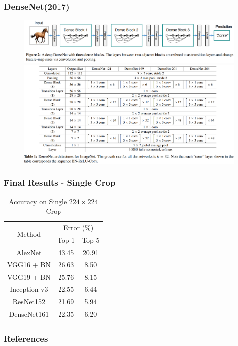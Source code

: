 \documentclass[9pt]{beamer}
\begin{document}
\begin{frame}
	\frametitle{DenseNet(2017)}
	\begin{figure}
		\includegraphics[scale=0.18]{./figures/edit/densenet_02.png} \\
		\includegraphics[scale=0.2]{./figures/edit/densenet_03.png} 		
	\end{figure}
\end{frame}

\begin{frame}
	\frametitle{Final Results - Single Crop}
		\begin{table}[]
		\centering
		\caption{Accuracy on Single $224\times 224$ Crop}
		\label{my-label}
		\begin{tabular}{|c|c|c|}
		\hline
		\multirow{2}{*}{Method} & \multicolumn{2}{c|}{Error (\%)} \\ \cline{2-3} 
		 & Top-1 & Top-5 \\ \hline
		AlexNet & 43.45 & 20.91 \\ \hline
		VGG16 + BN & 26.63 & 8.50 \\ \hline
		VGG19 + BN & 25.76 & 8.15 \\ \hline
		Inception-v3 & 22.55 & 6.44 \\ \hline
		ResNet152 & 21.69 & 5.94 \\ \hline
		DenseNet161 & 22.35 & 6.20 \\ \hline
		\end{tabular}
		\end{table}
\end{frame}

\begin{frame}[allowframebreaks]
        \frametitle{References}
        
        
\end{frame}
\end{document}
